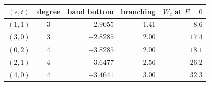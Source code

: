 \begin{tabular}{ccrrr}
\hline\hline
$(s,t)$ & degree & band bottom & branching & $W_{c}$ at $E=0$\\
\hline
$(1,1)$ & 3 & $-2.9655$ & $1.41$ & $8.6$\\
$(3,0)$ & 3 & $-2.8285$ & $2.00$ & $17.4$\\
$(0,2)$ & 4 & $-3.8285$ & $2.00$ & $18.1$\\
$(2,1)$ & 4 & $-3.6477$ & $2.56$ & $26.2$\\
$(4,0)$ & 4 & $-3.4641$ & $3.00$ & $32.3$\\
\hline\hline
\end{tabular}
